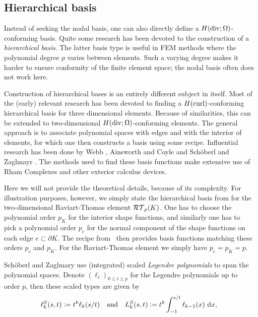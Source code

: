 \documentclass[thesis.tex]{subfiles}
\begin{document}
  \subsection{Hierarchical basis}
  Instead of seeking the nodal basis, one can also directly define a $H(\operatorname{div}; \Omega)$-conforming basis. Quite some research
  has been devoted  to the construction of  a \emph{hierarchical basis}. The latter basis type is useful in FEM methods where the
  polynomial degree $p$ varies between elements. Such a varying degree makes it harder to ensure conformity of the finite element space;
  the nodal basis often does not work here. 

  Construction of hierarchical bases is an entirely different subject in itself. Most of the (early) relevant research
  has been devoted to finding a $H(\operatorname{curl})$-conforming hierarchical basis for three dimensional elements. 
  Because of similarities, this can be extended to two-dimensional $H(\operatorname{div}; \Omega)$-conforming elements. The general approach is to
  associate polynomial spaces with edges and with the interior of elements, for which one then constructs a basis using some recipe.
  Influential research has been done by Webb \cite{webb}, Ainsworth and Coyle \cite{ainsworth2003hierarchic} and Sch\"oberl and Zaglmayr \cite{schoberl2005high}. 
  The methods used to find these basis functions make extensive use of Rham Complexes and other exterior calculus devices.
  
  Here we will not provide the theoretical details, because of its complexity.
  For illustration purposes, however, 
  we simply state the hierarchical basis from \cite{schoberl2005high} for the two-dimensional Raviart-Thomas element $\mathcal{RT}_p(K)$.
  One has to choose the polynomial order $p_K$ for the interior shape functions, and similarly one
  has to pick a polynomial order $p_e$ for the normal component of the shape functions on each edge $e \subset \partial K$.
  The recipe from~\cite{schoberl2005high} then provides basis functions matching these orders $p_e$ and $p_K$.
  For the Raviart-Thomas element we simply have $p_e = p_K =  p$.

  Sch\"oberl and Zaglmary use (integrated) scaled \emph{Legendre polynomials} to span the polynomial spaces.
  Denote $(\ell_i)_{0 \leq i \leq p}$ for the Legendre polynomials up to order $p$, then these scaled types
  are given by
  \[
    \ell_k^S(s,t) := t^k \ell_k(s/t) \quad \text{and} \quad L_k^S(s,t) := t^k \int_{-1}^{s/t} \ell_{k-1}(x) \, \dif x,
  \]
\end{document}
